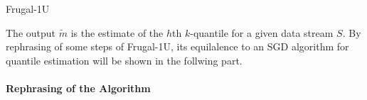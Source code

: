 \begin{algorithm}
\caption{Frugal-1U}\label{alg:frugal_1U}
    \begin{algorithmic}[1]
                \EndIf
            \EndFor
    \end{algorithmic}
\end{algorithm}
The output $\tilde{m}$ is the estimate of the $h$th $k$-quantile for a given data stream $S$. 
By rephrasing of some steps of Frugal-1U, 
its equilalence to an SGD algorithm for quantile estimation will be shown in the follwing part.
\\\\
\textbf{Rephrasing of the Algorithm} \label{replacements}
